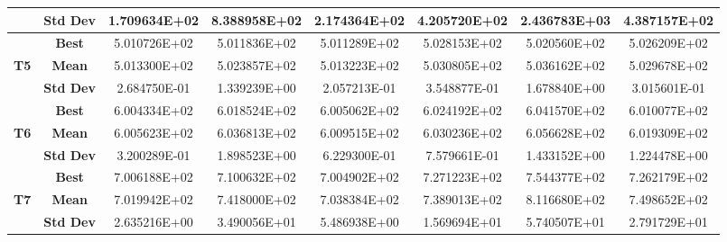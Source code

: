 \documentclass{llncs}
\begin{document}
\begin{center}
\begin{table}[htbp]
{\begin{tabular}{|c|c|c|c|c|c|c|c|}
		\multicolumn{ 1}{|c|}{} & \textbf{Std Dev} & 1.709634E+02 & 8.388958E+02 & 2.174364E+02 & 4.205720E+02 & 2.436783E+03 & 4.387157E+02 \\ \hline
		\multicolumn{ 1}{|c|}{} & \textbf{Best} & 5.010726E+02 & 5.011836E+02 & 5.011289E+02 & 5.028153E+02 & 5.020560E+02 & 5.026209E+02 \\ \cline{ 2- 8}
		\multicolumn{ 1}{|c|}{\textbf{T5}} & \textbf{Mean} & 5.013300E+02 & 5.023857E+02 & 5.013223E+02 & 5.030805E+02 & 5.036162E+02 & 5.029678E+02 \\ \cline{ 2- 8}
		\multicolumn{ 1}{|c|}{} & \textbf{Std Dev} & 2.684750E-01 & 1.339239E+00 & 2.057213E-01 & 3.548877E-01 & 1.678840E+00 & 3.015601E-01 \\ \hline
		\multicolumn{ 1}{|c|}{} & \textbf{Best} & 6.004334E+02 & 6.018524E+02 & 6.005062E+02 & 6.024192E+02 & 6.041570E+02 & 6.010077E+02 \\ \cline{ 2- 8}
		\multicolumn{ 1}{|c|}{\textbf{T6}} & \textbf{Mean} & 6.005623E+02 & 6.036813E+02 & 6.009515E+02 & 6.030236E+02 & 6.056628E+02 & 6.019309E+02 \\ \cline{ 2- 8}
		\multicolumn{ 1}{|c|}{} & \textbf{Std Dev} & 3.200289E-01 & 1.898523E+00 & 6.229300E-01 & 7.579661E-01 & 1.433152E+00 & 1.224478E+00 \\ \hline
		\multicolumn{ 1}{|c|}{} & \textbf{Best} & 7.006188E+02 & 7.100632E+02 & 7.004902E+02 & 7.271223E+02 & 7.544377E+02 & 7.262179E+02 \\ \cline{ 2- 8}
		\multicolumn{ 1}{|c|}{\textbf{T7}} & \textbf{Mean} & 7.019942E+02 & 7.418000E+02 & 7.038384E+02 & 7.389013E+02 & 8.116680E+02 & 7.498652E+02 \\ \cline{ 2- 8}
		\multicolumn{ 1}{|c|}{} & \textbf{Std Dev} & 2.635216E+00 & 3.490056E+01 & 5.486938E+00 & 1.569694E+01 & 5.740507E+01 & 2.791729E+01 \\ \hline
	\end{tabular}}
	\label{tbl1}
\end{table}
\end{center}
\end{document}
